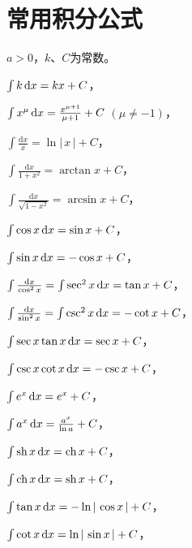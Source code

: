 \documentclass[UTF8]{ctexart}
\begin{document}
\section{常用积分公式}
\qquad \qquad \qquad \qquad $a>0$，$k$、$C$为常数。
  \begin{tabenum}[(1)] \qquad \qquad
    \item $ \int k \,\mathrm{d} x                             =kx+C $，
    \item $ \int x^\mu \,\mathrm{d} x                           =\frac{x^{\mu +1}}{\mu +1}+C $ $(\mu \ne -1) $，\\
    \item $ \int \frac{\mathrm{d} x}{x}              = \ln |\,x\,|+C $，\\
    \item $ \int \frac{\mathrm{d} x}{1+x^2}          = \arctan x +C $，\\
    \item $ \int \frac{\mathrm{d} x}{\sqrt{1-x^2}}   = \arcsin x +C $，\\
    \item $ \int \cos x \,\mathrm{d} x                          = \sin x+C $，
    \item $ \int \sin x \,\mathrm{d} x                          = -\cos x +C $，\\
    \item $ \int \frac{\mathrm{d}x}{\cos ^2 x}       = \int \sec^2 x \,\mathrm{d} x=\tan x+C $，
    \item $ \int \frac{\mathrm{d}x}{\sin ^2 x}       = \int \csc^2 x \,\mathrm{d} x=-\cot x+C $，\\
    \item $ \int \sec x \tan x \,\mathrm{d} x                   = \sec x+C $，
    \item $ \int \csc x \cot x \,\mathrm{d} x                   = -\csc x+C $，\\
    \item $ \int e^x \,\mathrm{d} x                             = e^x+C $，
    \item $ \int a^x \,\mathrm{d} x                             = \frac{a^x}{\ln a}+C$，\\
    \item $ \int \mathrm{sh}\,x \,\mathrm{d} x=\mathrm{ch}\,x+C  $，
    \item $ \int \mathrm{ch}\,x \,\mathrm{d} x=\mathrm{sh}\,x+C $，\\
    \item $ \int \tan x \,\mathrm{d} x =-\ln |\,\cos x \,|+C $，
    \item $ \int \cot x \,\mathrm{d} x =\ln |\,\sin x \,|+C $，\\

\end{tabenum}
\end{document}
